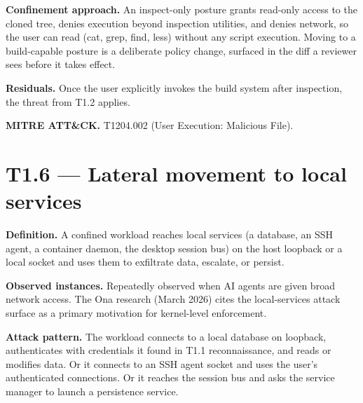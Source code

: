 \textbf{Confinement approach.} An inspect-only posture grants read-only
access to the cloned tree, denies execution beyond inspection utilities,
and denies network, so the user can read (cat, grep, find, less) without
any script execution. Moving to a build-capable posture is a deliberate
policy change, surfaced in the diff a reviewer sees before it takes
effect.

\textbf{Residuals.} Once the user explicitly invokes the build system
after inspection, the threat from T1.2 applies.

\textbf{MITRE ATT\&CK.} T1204.002 (User Execution: Malicious File).

\hypertarget{t1.6-lateral-movement-to-local-services}{%
\section{T1.6 --- Lateral movement to local
services}\label{t1.6-lateral-movement-to-local-services}}

\textbf{Definition.} A confined workload reaches local services (a
database, an SSH agent, a container daemon, the desktop session bus) on
the host loopback or a local socket and uses them to exfiltrate data,
escalate, or persist.

\textbf{Observed instances.} Repeatedly observed when AI agents are
given broad network access. The Ona research (March 2026) cites the
local-services attack surface as a primary motivation for kernel-level
enforcement.

\textbf{Attack pattern.} The workload connects to a local database on
loopback, authenticates with credentials it found in T1.1
reconnaissance, and reads or modifies data. Or it connects to an SSH
agent socket and uses the user's authenticated connections. Or it
reaches the session bus and asks the service manager to launch a
persistence service.

